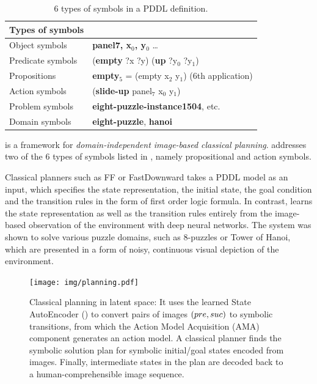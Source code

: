 \begin{table}[tbp] 
\centering
{}
\begin{tabular}{ll}
Types of symbols & \\
\hline
Object symbols    & \textbf{panel7, x\(_{\text{0}}\), y\(_{\text{0}}\)} \ldots{}               \\
Predicate symbols & (\textbf{empty} ?x ?y) (\textbf{up} ?y\(_{\text{0}}\) ?y\(_{\text{1}}\))   \\
Propositions      & \textbf{empty\(_{\text{5}}\)} = (empty x\(_{\text{2}}\) y\(_{\text{1}}\)) (6th application) \\
Action symbols    & (\textbf{slide-up} panel\(_{\text{7}}\) x\(_{\text{0}}\) y\(_{\text{1}}\)) \\
Problem symbols   & \textbf{eight-puzzle-instance1504}, etc.                                   \\
Domain  symbols   & \textbf{eight-puzzle}, \textbf{hanoi}                                      \\
\hline
\end{tabular}
\caption{6 types of symbols in a PDDL definition.}
\label{tab:type-of-symbols}
\end{table}

\textbf{\latentplanner} \cite{Asai2018} is a framework for
\emph{domain-independent image-based classical planning}.
\latentplanner addresses two of the 6 types of symbols listed in ,
namely propositional and action symbols.

Classical planners such as FF \cite{Hoffmann01} or
FastDownward \cite{Helmert04} takes a PDDL model as an input, which
specifies the state representation, the initial state, the goal
condition and the transition rules in the form of first order logic
formula.  In contrast, \latentplanner learns the state representation as well as the transition rules
entirely from the image-based observation of the environment with deep neural networks.
The system was shown to solve various puzzle domains, such as 8-puzzles or Tower of Hanoi,
which are presented in a form of noisy, continuous visual depiction of the environment.

\begin{figure}[htb]
 \centering
 \texttt{[image: img/planning.pdf]}
 \caption{Classical planning in latent space:
It uses the learned State AutoEncoder () to convert pairs of images $(pre,suc)$ to symbolic transitions,
 from which the Action Model Acquisition (AMA) component generates an action model.
A classical planner finds the symbolic solution plan for symbolic initial/goal states encoded from images.
Finally, intermediate states in the plan are decoded back to a human-comprehensible image sequence.}
\label{fig:overview}
\end{figure}

